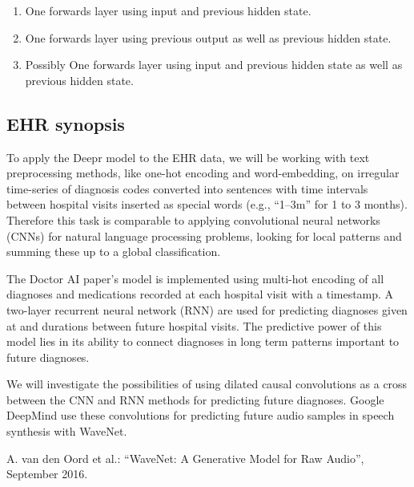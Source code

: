 
	
	\begin{enumerate}
		\item One forwards layer using input and previous hidden state.
		\item One forwards layer using previous output as well as previous hidden state.
		\item Possibly One forwards layer using input and previous hidden state as well as previous hidden state.
	\end{enumerate}

\subsection*{EHR synopsis}

To apply the Deepr model to the EHR data, we will be working with text preprocessing methods, like one-hot encoding and word-embedding, on irregular time-series of diagnosis codes converted into sentences with time intervals between hospital visits inserted as special words (e.g., “1--3m” for 1 to 3 months). Therefore this task is comparable to applying convolutional neural networks (CNNs) for natural language processing problems, looking for local patterns and summing these up to a global classification.

The Doctor AI paper’s model is implemented using multi-hot encoding of all diagnoses and medications recorded at each hospital visit with a timestamp. A two-layer recurrent neural network (RNN) are used for predicting diagnoses given at and durations between future hospital visits. The predictive power of this model lies in its ability to connect diagnoses in long term patterns important to future diagnoses.

We will investigate the possibilities of using dilated causal convolutions as a cross between the CNN and RNN methods for predicting future diagnoses. Google DeepMind use these convolutions for predicting future audio samples in speech synthesis with WaveNet.

A. van den Oord et al.: “WaveNet: A Generative Model for Raw Audio”, September 2016.
